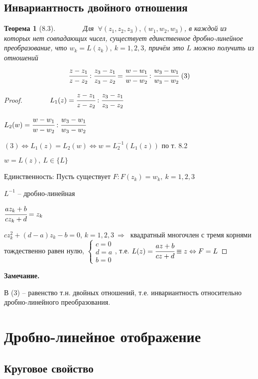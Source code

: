 \documentclass[final]{report}
\newcommand{\forcenewline}{$\phantom{\mbox{newline}}$\newline}
\newcommand{\then}{\ \Rightarrow\ }
\newcommand{\LRA}{\Leftrightarrow}
\newcommand{\F}{\ \forall}
\newcommand{\sys}[1]{\left\{\begin{matrix}#1\end{matrix}\right.}
\newtheorem*{theor}{Теорема}
\theoremstyle{remark}
\begin{document}
\subsection{Инвариантность двойного отношения}
\begin{theor}[8.3]
\forcenewline
Для $\F(z_1,z_2,z_3),(w_1,w_2,w_3)$, в каждой из которых нет совпадающих чисел, существует единственное дробно-линейное преобразование, что $w_k=L(z_k),\ k=1,2,3$, причём это $L$ можно получить из отношений
$$
\cfrac{z-z_1}{z-z_2}:\cfrac{z_3-z_1}{z_3-z_2}=\cfrac{w-w_1}{w-w_2}:\cfrac{w_3-w_1}{w_3-w_2}\ (3)
$$
\end{theor}

\begin{proof}
\forcenewline
$L_1(z)=\cfrac{z-z_1}{z-z_2}:\cfrac{z_3-z_1}{z_3-z_2}$

$L_2(w)=\cfrac{w-w_1}{w-w_2}:\cfrac{w_3-w_1}{w_3-w_2}$

$(3) \LRA L_1(z)=L_2(w) \LRA w=L^{-1}_2(L_1(z))$ по т. 8.2

$w=L(z),\ L\in\{L\}$

Единственность: Пусть существует $F\colon F(z_k)=w_k,\ k=1,2,3$

$L^{-1}$ -- дробно-линейная

$\cfrac{az_k+b}{cz_k+d}=z_k$

$cz_k^2+(d-a)z_k-b=0$, $k=1,2,3 \then $ квадратный многочлен с тремя корнями тождественно равен нулю, $\sys{c=0 \\ d=a \\ b=0}$, т.е. $L(z)=\cfrac{az+b}{cz+d}\equiv z \LRA F=L$
\end{proof}

{\bfseries Замечание.}

В (3) -- равенство т.н. двойных отношений, т.е. инвариантность относительно дробно-линейного преобразования.

\newpage

\section{Дробно-линейное отображение}

\subsection{Круговое свойство}
\end{document}
